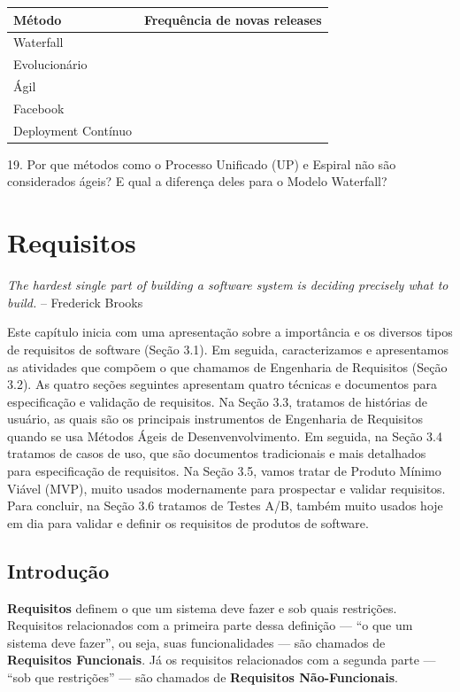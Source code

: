\documentclass[
  11pt,
  twoside]{book}
\renewenvironment{quote}{\centering \vspace{1.5ex} \begin{tcolorbox}[colback=backcolor, width=4.9in]}{\end{tcolorbox}}
\begin{document}
\begin{longtable}[]{@{}ll@{}}
\toprule
\textbf{Método} & \textbf{Frequência de novas releases}\tabularnewline
\midrule
\endhead
Waterfall &\tabularnewline
Evolucionário &\tabularnewline
Ágil &\tabularnewline
Facebook &\tabularnewline
Deployment Contínuo &\tabularnewline
\bottomrule
\end{longtable}

19. Por que métodos como o Processo Unificado (UP) e Espiral não são
considerados ágeis? E qual a diferença deles para o Modelo Waterfall?

\hypertarget{requisitos}{%
\chapter{Requisitos}\label{requisitos}}

\begin{quote}
\emph{The hardest single part of building a software system is deciding
precisely what to build.} -- Frederick Brooks
\end{quote}

 Este capítulo inicia com uma apresentação sobre a
importância e os diversos tipos de requisitos de software (Seção 3.1).
Em seguida, caracterizamos e apresentamos as atividades que compõem o
que chamamos de Engenharia de Requisitos (Seção 3.2). As quatro seções
seguintes apresentam quatro técnicas e documentos para especificação e
validação de requisitos. Na Seção 3.3, tratamos de histórias de usuário,
as quais são os principais instrumentos de Engenharia de Requisitos
quando se usa Métodos Ágeis de Desenvenvolvimento. Em seguida, na Seção
3.4 tratamos de casos de uso, que são documentos tradicionais e mais
detalhados para especificação de requisitos. Na Seção 3.5, vamos tratar
de Produto Mínimo Viável (MVP), muito usados modernamente para
prospectar e validar requisitos. Para concluir, na Seção 3.6 tratamos de
Testes A/B, também muito usados hoje em dia para validar e definir os
requisitos de produtos de software.

\hypertarget{introduuxe7uxe3o-1}{%
\section{Introdução}\label{introduuxe7uxe3o-1}}

 \textbf{Requisitos} definem o que um
sistema deve fazer e sob quais restrições. Requisitos relacionados com a
primeira parte dessa definição --- ``o que um sistema deve fazer'', ou
seja, suas funcionalidades --- são chamados de \textbf{Requisitos
Funcionais}. Já os requisitos relacionados com a segunda parte --- ``sob
que restrições'' --- são chamados de \textbf{Requisitos Não-Funcionais}.
\end{document}
